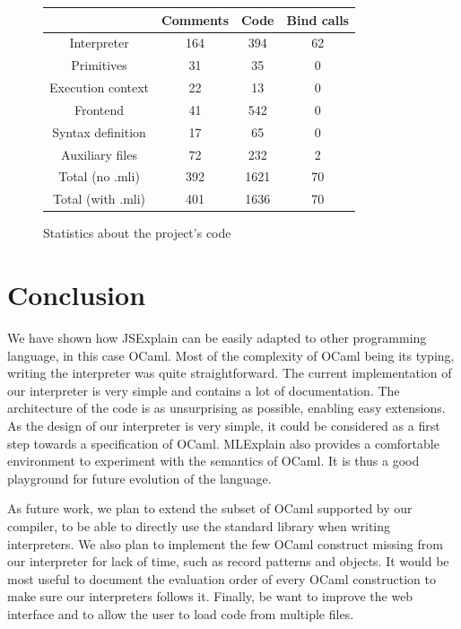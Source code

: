 \documentclass[twocolumn,a4paper]{article}
\begin{document}
\begin{figure}
  \begin{tabular}{| c | c | c | c |}
    \hline
    & Comments & Code & Bind calls \\
    \hline
    Interpreter & 164 & 394 & 62 \\
    Primitives & 31 & 35 & 0 \\
    Execution context & 22 & 13 & 0 \\
    Frontend & 41 & 542 & 0 \\
    Syntax definition & 17 & 65 & 0 \\
    Auxiliary files & 72 & 232 & 2 \\
    \hline
    Total (no .mli) & 392 & 1621 & 70 \\
    Total (with .mli) & 401 & 1636 & 70 \\
    \hline
  \end{tabular}

  \centering
  \caption{Statistics about the project's code}
  \label{fig:statistics}
\end{figure}

\section{Conclusion}
We have shown how JSExplain can be easily adapted to other programming language,
in this case OCaml. Most of the complexity of OCaml being its typing, writing
the interpreter was quite straightforward. The current implementation of our
interpreter is very simple and contains a lot of documentation. The architecture
of the code is as unsurprising as possible, enabling easy extensions. As the
design of our interpreter is very simple, it could be considered as a first step
towards a specification of OCaml. MLExplain also provides a comfortable
environment to experiment with the semantics of OCaml. It is thus a good
playground for future evolution of the language.

As future work, we plan to extend the subset of OCaml supported by our compiler,
to be able to directly use the standard library when writing interpreters. We
also plan to implement the few OCaml construct missing from our interpreter for
lack of time, such as record patterns and objects. It would be most useful to
document the evaluation order of every OCaml construction to make sure our
interpreters follows it. Finally, be want to improve the web interface and to
allow the user to load code from multiple files.



\end{document}
